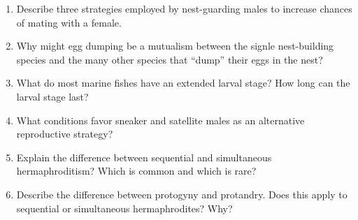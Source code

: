 \documentclass[letterpaper]{tufte-handout}
\begin{document}
\begin{enumerate}

	\item Describe three strategies employed by nest-guarding males to increase chances of mating with a female.
	
	\item Why might egg dumping be a mutualism between the signle nest-building species and the many other species that “dump” their eggs in the nest?

	\item What do most marine fishes have an extended larval stage?  How long can the larval stage last? %

	\item What conditions favor sneaker and satellite males as an alternative reproductive strategy?  


	\item Explain the difference between sequential and simultaneous hermaphroditism? Which is common and which is rare? 
	
	\item Describe the difference between protogyny and protandry. Does this apply to sequential or simultaneous hermaphrodites? Why?

\end{enumerate}
\end{document}
